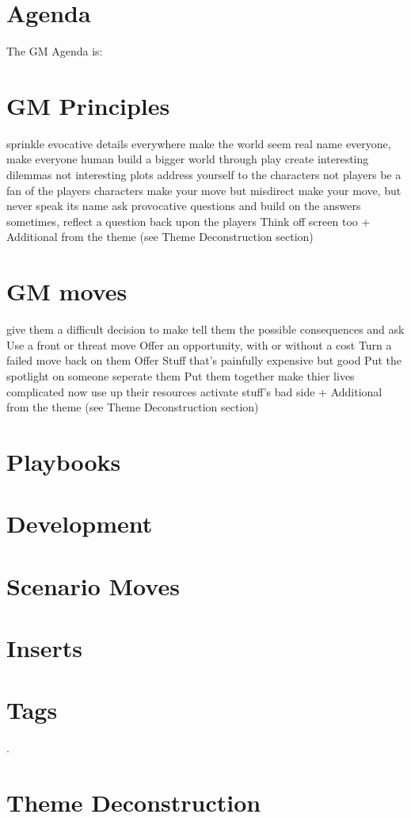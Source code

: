 \documentclass{tufte-handout}
\begin{document}
\section{Agenda}
The GM Agenda is: 

\section{GM Principles}
sprinkle evocative details everywhere 
make the world seem real
name everyone, make everyone human
build a bigger world through play
create interesting dilemmas not interesting plots
address yourself to the characters not players
be a fan of the players characters 
make your move but misdirect
make your move, but never speak its name
ask provocative questions and build on the answers 
sometimes, reflect a question back upon the players 
Think off screen too
+ Additional from the theme (see Theme Deconstruction section)


\section{GM moves}
give them a difficult decision to make
tell them the possible consequences and ask
Use a front or threat move
Offer an opportunity, with or without a cost
Turn a failed move back on them
Offer Stuff that's painfully expensive but good
Put the spotlight on someone
seperate them
Put them together 
make thier lives complicated now
use up their resources 
activate stuff's bad side
+ Additional from the theme (see Theme Deconstruction section)


\section{Playbooks}
\section{ Development}
\section{Scenario Moves}
\section{Inserts}
\section{Tags}.

\section{Theme Deconstruction}
\end{document}
